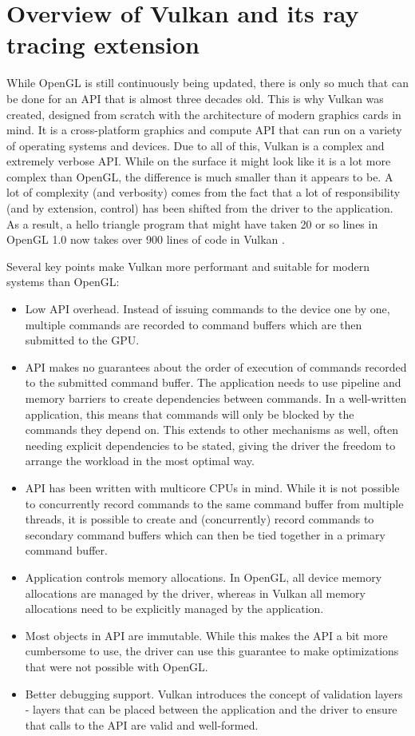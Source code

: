 \documentclass[times, utf8, zavrsni, numeric]{fer}
\begin{document}
\chapter{Overview of Vulkan and its ray tracing extension}
While OpenGL is still continuously being updated, there is only so much that can be done for an API that is almost three decades old. This is why Vulkan was created, designed from scratch with the architecture of modern graphics cards in mind. It is a cross-platform graphics and compute API that can run on a variety of operating systems and devices. Due to all of this, Vulkan is a complex and extremely verbose API. While on the surface it might look like it is a lot more complex than OpenGL, the difference is much smaller than it appears to be. A lot of complexity (and verbosity) comes from the fact that a lot of responsibility (and by extension, control) has been shifted from the driver to the application. As a result, a hello triangle program that might have taken 20 or so lines in OpenGL 1.0 now takes over 900 lines of code in Vulkan \cite{vulkan_tutorial}.

Several key points make Vulkan more performant and suitable for modern systems than OpenGL:
\begin{itemize}
	\item Low API overhead. Instead of issuing commands to the device one by one, multiple commands are recorded to command buffers which are then submitted to the GPU.
	\item API makes no guarantees about the order of execution of commands recorded to the submitted command buffer. The application needs to use pipeline and memory barriers to create dependencies between commands. In a well-written application, this means that commands will only be blocked by the commands they depend on. This extends to other mechanisms as well, often needing explicit dependencies to be stated, giving the driver the freedom to arrange the workload in the most optimal way.
	\item API has been written with multicore CPUs in mind. While it is not possible to concurrently record commands to the same command buffer from multiple threads, it is possible to create and (concurrently) record commands to secondary command buffers which can then be tied together in a primary command buffer.
	\item Application controls memory allocations. In OpenGL, all device memory allocations are managed by the driver, whereas in Vulkan all memory allocations need to be explicitly managed by the application.
	\item Most objects in API are immutable. While this makes the API a bit more cumbersome to use, the driver can use this guarantee to make optimizations that were not possible with OpenGL.
	\item Better debugging support. Vulkan introduces the concept of validation layers - layers that can be placed between the application and the driver to ensure that calls to the API are valid and well-formed.
\end{itemize}
\end{document}
